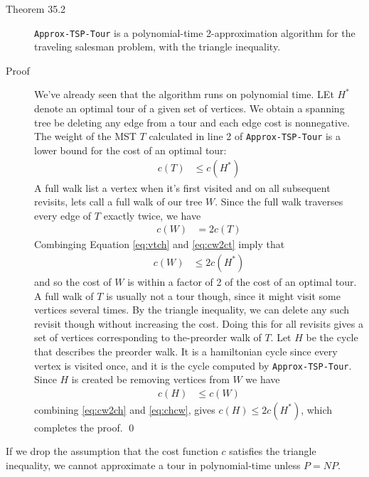 \begin{description}
\item[Theorem 35.2] \texttt{Approx-TSP-Tour} is a polynomial-time
  2-approximation algorithm for the traveling salesman problem, with the
  triangle inequality.

\item[Proof] We've already seen that the algorithm runs on polynomial time.
  LEt $H^*$ denote an optimal tour of a given set of vertices. We obtain a spanning tree be deleting
  any edge from a tour and each edge cost is nonnegative. The weight of the MST $T$ calculated in line 2
  of \texttt{Approx-TSP-Tour} is a lower bound for the cost of an optimal tour:
  \begin{align}
    c(T) &\leq c(H^*) \label{eq:vtch}
  \end{align}
  A full walk list a vertex when it's first visited and on all subsequent revisits, lets call a full walk of our tree $W$.
  Since the full walk traverses every edge of $T$ exactly twice, we have
  \begin{align}
    c(W) &= 2c(T) \label{eq:cw2ct}
  \end{align}
  Combinging Equation \ref{eq:vtch} and \ref{eq:cw2ct} imply that
  \begin{align}
    c(W) &\leq 2c(H^*) \label{eq:cw2ch}
  \end{align}
  and so the cost of $W$ is within a factor of 2 of the cost of an optimal tour.
  A full walk of $T$ is usually not a tour though, since it might visit some vertices several times.
  By the triangle inequality, we can delete any such revisit though without increasing the cost. Doing this for all revisits gives a set of vertices corresponding to the-preorder walk of $T$.
  Let $H$ be the cycle that describes the preorder walk. It is a hamiltonian cycle since every vertex is visited once,
  and it is the cycle computed by \texttt{Approx-TSP-Tour}. Since $H$ is created be removing vertices from $W$ we have
  \begin{align}
    c(H) &\leq c(W) \label{eq:chcw}
  \end{align}
  combining \ref{eq:cw2ch} and \ref{eq:chcw}, gives $c(H) \leq 2c(H^*)$, which completes the proof.
  \qed
\end{description}

If we drop the assumption that the cost function $c$ satisfies the triangle inequality, we cannot
approximate a tour in polynomial-time unless $P=NP$.

